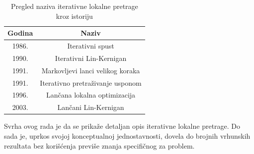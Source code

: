 \documentclass[a4paper]{article}
\begin{document}
\begin{table}[H]
  \caption{Pregled naziva iterativne lokalne pretrage kroz istoriju}
  \label{tab:istorija}
  \begin{center}
      \begin{adjustbox}{max width=1.0\linewidth,center}
   \begin{tabular}{|c| c |} 
   \hline
   Godina & Naziv\\ [0.5ex] 
   \hline\hline
   1986. & Iterativni spust\\
   \hline
   1990. & Iterativni Lin-Kernigan\\
   \hline
   1991. & Markovljevi lanci velikog koraka\\
   \hline
   1991. & Iterativno pretraživanje usponom\\
   \hline
   1996. & Lančana lokalna optimizacija\\
   \hline
   2003. & Lančani Lin-Kernigan\\
   \hline
   \end{tabular}
  \end{adjustbox}
  \end{center}
  \end{table}
Svrha ovog rada je da se prikaže detaljan opis iterativne lokalne pretrage. Do sada je, uprkos svojoj konceptualnoj jednostavnosti, dovela do brojnih vrhunskih rezultata bez korišćenja previše znanja specifičnog za problem.\par








\end{document}
